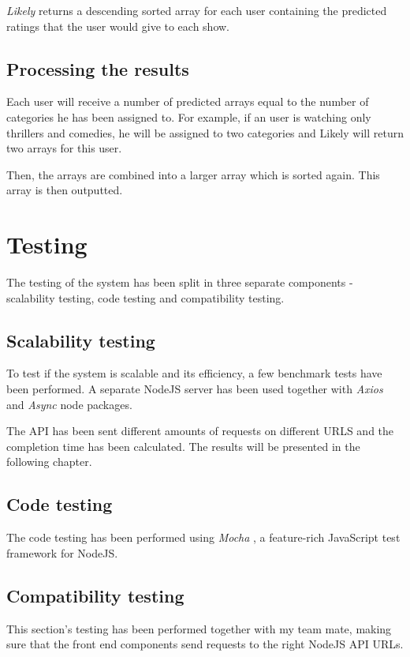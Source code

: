 \textit{Likely} returns a descending sorted array for each user containing the predicted ratings that the user would give to each show.

\subsection{Processing the results}

Each user will receive a number of predicted arrays equal to the number of categories he has been assigned to. For example, if an user is watching only thrillers and comedies, he will be assigned to two categories and Likely will return two arrays for this user.

Then, the arrays are combined into a larger array which is sorted again. This array is then outputted.

\section{Testing}

The testing of the system has been split in three separate components - scalability testing, code testing and compatibility testing.

\subsection{Scalability testing}

To test if the system is scalable and its efficiency, a few benchmark tests have been performed. A separate NodeJS server has been used together with \textit{Axios} and \textit{Async} node packages.

The API has been sent different amounts of requests on different URLS and the completion time has been calculated. The results will be presented in the following chapter.

\subsection{Code testing}

The code testing has been performed using \textit{Mocha} \cite{mocha}, a feature-rich JavaScript test framework for NodeJS.

\subsection{Compatibility testing}

This section's testing has been performed together with my team mate, making sure that the front end components send requests to the right NodeJS API URLs.